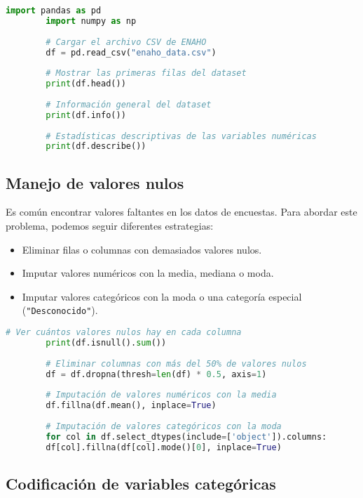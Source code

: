 \documentclass{book}
\begin{document}
	\begin{lstlisting}[language=Python, caption=Carga y exploración de datos]
		import pandas as pd
		import numpy as np
		
		# Cargar el archivo CSV de ENAHO
		df = pd.read_csv("enaho_data.csv")
		
		# Mostrar las primeras filas del dataset
		print(df.head())
		
		# Información general del dataset
		print(df.info())
		
		# Estadísticas descriptivas de las variables numéricas
		print(df.describe())
	\end{lstlisting}
	
	\subsection{Manejo de valores nulos}
	
	Es común encontrar valores faltantes en los datos de encuestas. Para abordar este problema, podemos seguir diferentes estrategias:
	
	\begin{itemize}
		\item Eliminar filas o columnas con demasiados valores nulos.
		\item Imputar valores numéricos con la media, mediana o moda.
		\item Imputar valores categóricos con la moda o una categoría especial (\texttt{"Desconocido"}).
	\end{itemize}
	
	\begin{lstlisting}[language=Python, caption=Manejo de valores nulos]
		# Ver cuántos valores nulos hay en cada columna
		print(df.isnull().sum())
		
		# Eliminar columnas con más del 50% de valores nulos
		df = df.dropna(thresh=len(df) * 0.5, axis=1)
		
		# Imputación de valores numéricos con la media
		df.fillna(df.mean(), inplace=True)
		
		# Imputación de valores categóricos con la moda
		for col in df.select_dtypes(include=['object']).columns:
		df[col].fillna(df[col].mode()[0], inplace=True)
	\end{lstlisting}
	
	\subsection{Codificación de variables categóricas}
	
\end{document}
